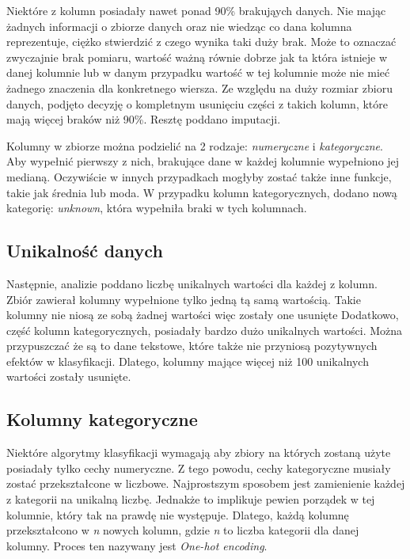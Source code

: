 \documentclass[a4paper,12pt]{article}
\begin{document}
    Niektóre z kolumn posiadały nawet ponad 90\% brakująych danych.
    Nie mając żadnych informacji o zbiorze danych oraz nie wiedząc co dana kolumna reprezentuje, ciężko stwierdzić z czego wynika taki duży brak.
    Może to oznaczać zwyczajnie brak pomiaru, wartość ważną równie dobrze jak ta która istnieje w danej kolumnie lub w danym przypadku wartość w tej kolumnie może nie mieć żadnego znaczenia dla konkretnego wiersza.
    Ze względu na duży rozmiar zbioru danych, podjęto decyzję o kompletnym usunięciu części z takich kolumn, które mają więcej braków niż 90\%.
    Resztę poddano imputacji.

    Kolumny w zbiorze można podzielić na 2 rodzaje: \textit{numeryczne} i \textit{kategoryczne}.
    Aby wypełnić pierwszy z nich, brakujące dane w każdej kolumnie wypełniono jej medianą.
    Oczywiście w innych przypadkach mogłyby zostać także inne funkcje, takie jak średnia lub moda.
    W przypadku kolumn kategorycznych, dodano nową kategorię: \textit{unknown}, która wypełniła braki w tych kolumnach.

    \subsection{Unikalność danych}
    Następnie, analizie poddano liczbę unikalnych wartości dla każdej z kolumn.
    Zbiór zawierał kolumny wypełnione tylko jedną tą samą wartością.
    Takie kolumny nie niosą ze sobą żadnej wartości więc zostały one usunięte
    Dodatkowo, część kolumn kategorycznych, posiadały bardzo dużo unikalnych wartości.
    Można przypuszczać że są to dane tekstowe, które także nie przyniosą pozytywnych efektów w klasyfikacji.
    Dlatego, kolumny mające więcej niż 100 unikalnych wartości zostały usunięte.

    \subsection{Kolumny kategoryczne}
    Niektóre algorytmy klasyfikacji wymagają aby zbiory na których zostaną użyte posiadały tylko cechy numeryczne.
    Z tego powodu, cechy kategoryczne musiały zostać przekształcone w liczbowe.
    Najprostszym sposobem jest zamienienie każdej z kategorii na unikalną liczbę.
    Jednakże to implikuje pewien porządek w tej kolumnie, który tak na prawdę nie występuje.
    Dlatego, każdą kolumnę przekształcono w \textit{n} nowych kolumn, gdzie \textit{n} to liczba kategorii dla danej kolumny.
    Proces ten nazywany jest \textit{One-hot encoding}.
\end{document}
